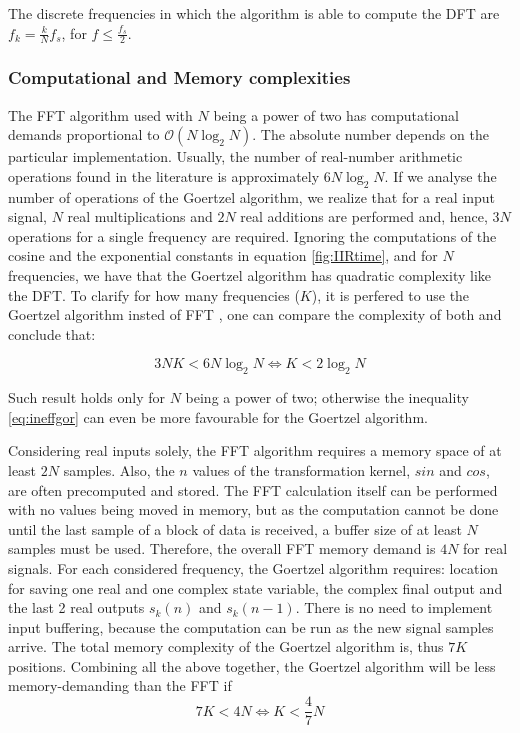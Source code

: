 \documentclass[12pt,a4paper,openright]{report}
\begin{document}
The discrete frequencies in which the algorithm is able to compute the DFT are ${f_k} = \frac{k}{N}{f_s}$, for $f \leq \frac{f_s}{2}$.

\subsubsection{Computational and Memory complexities}

The FFT algorithm used with $N$ being a power of two has computational demands proportional to $\mathcal{O}(N\log_2 N)$. The absolute number depends on the particular implementation. Usually, the number of real-number arithmetic operations found in the literature is approximately $6N \log_2 N$. If we analyse the number of operations of the Goertzel algorithm, we realize that for a real input signal, $N$ real multiplications and $2N$ real additions are performed and, hence, $3N$ operations for a single frequency are required. Ignoring the computations of the cosine and the exponential constants in equation \ref{fig:IIRtime}, and for $N$ frequencies, we have that the Goertzel algorithm has quadratic complexity like the DFT. To clarify for how many frequencies ($K$), it is perfered to use the Goertzel algorithm insted of FFT \cite{GoertzelPaper}, one can compare the complexity of both and conclude that: 


\begin{equation}
3NK < 6N{\log _2}N \Leftrightarrow K < 2{\log _2}N
\label{eq:ineffgor}
\end{equation}

Such  result holds only for $N$ being a power of two; otherwise the inequality \ref{eq:ineffgor} can even be more favourable for the Goertzel algorithm.

Considering real inputs solely, the FFT algorithm requires a memory space of at least $2N$ samples. Also, the $n$ values of the transformation kernel, $sin$ and $cos$, are often precomputed and stored. The FFT calculation itself can be performed with no values being moved in memory, but as the computation cannot be done until the last sample of a block of data is received, a buffer size of at least $N$ samples must be used. Therefore, the overall FFT memory demand is $4N$ for real signals.
For each considered frequency, the Goertzel algorithm requires: location for saving one real and one complex state variable, the complex final output and the last 2 real outputs $s_k(n)$ and $s_k(n-1)$. There is no need to implement input buffering, because the computation can be run as the new signal samples arrive. The total memory complexity of the Goertzel algorithm is, thus $7K$ positions. Combining all the above together, the Goertzel algorithm will be less memory-demanding than the FFT if \cite{GoertzelPaper}
\begin{equation}
7K < 4N \Leftrightarrow K < \frac{4}{7}N
\end{equation}
\end{document}
